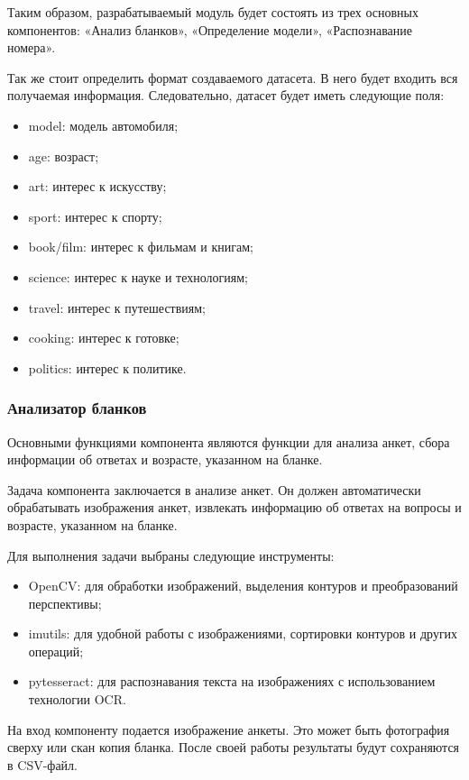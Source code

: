 Таким образом, разрабатываемый модуль будет состоять из трех основных компонентов: «Анализ бланков», «Определение модели», «Распознавание номера».

Так же стоит определить формат создаваемого датасета. В него будет входить вся получаемая информация. Следовательно, датасет будет иметь следующие поля:

\begin{itemize}
    \item model: модель автомобиля;
    \item age: возраст;
    \item art: интерес к искусству;
    \item sport: интерес к спорту;
    \item book/film: интерес к фильмам и книгам;
    \item science: интерес к науке и технологиям;
    \item travel: интерес к путешествиям;
    \item cooking: интерес к готовке;
    \item politics: интерес к политике.
\end{itemize}


\subsubsection{Анализатор бланков}

Основными функциями компонента являются функции для анализа анкет, сбора информации об ответах и возрасте, указанном на бланке.

Задача компонента заключается в анализе анкет. Он должен автоматически обрабатывать изображения анкет, извлекать информацию об ответах на вопросы и возрасте, указанном на бланке.

Для выполнения задачи выбраны следующие инструменты:
\begin{itemize}
    \item OpenCV: для обработки изображений, выделения контуров и преобразований перспективы;
    \item imutils: для удобной работы с изображениями, сортировки контуров и других операций;
    \item pytesseract: для распознавания текста на изображениях с использованием технологии OCR.
\end{itemize}

На вход компоненту подается изображение анкеты. Это может быть фотография сверху или скан копия бланка. После своей работы результаты будут сохраняются в CSV-файл.

